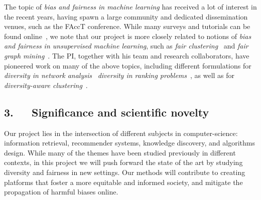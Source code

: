 \documentclass[a4paper,11pt]{article}
\begin{document}

The topic of \emph{bias and fairness in machine learning} has received a lot of interest in the recent years, 
having spawn a large community and dedicated dissemination venues, such as the FAccT conference. 
While many surveys and tutorials can be found online~\cite{caton2020fairness,mehrabi2021survey}, 
we note that our project is more closely related to notions of
\emph{bias and fairness in unsupervised machine learning}, 
such as 
\emph{fair clustering}~\cite{chierichetti2017fair}
and \emph{fair graph mining}~\cite{dong2023fairness}.
%
The PI, together with his team and research collaborators, 
have pioneered work on many of the above topics,
including
different formulations for \emph{diversity in network analysis}~\cite{adriaens2023minimizing,cinus2023rebalancing,coupette2023reducing,oettershagen2024finding}
\emph{diversity in ranking problems}~\cite{zhang2022ranking}, 
as well as for \emph{diversity-aware clustering}~\cite{thejaswi2021diversity}.

\subsection*{3.~~~Significance and scientific novelty}



Our project lies in the intersection of different subjects in computer-science:
information retrieval, recommender systems, knowledge discovery, and algorithms design. 
While many of the themes have been studied previously in different contexts,
in this project we will push forward the state of the art 
by studying diversity and fairness in new settings.
Our methods will contribute to creating platforms that foster a more equitable and informed society, 
and mitigate the propagation of harmful biases online.
\end{document}
